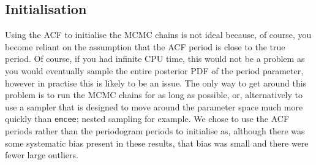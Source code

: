 \subsection{Initialisation}
Using the ACF to initialise the MCMC chains is not ideal because, of course,
you become reliant on the assumption that the ACF period is close to the true
period.
Of course, if you had infinite CPU time, this would not be a problem as you
would eventually sample the entire posterior PDF of the period parameter,
however in practise this is likely to be an issue.
The only way to get around this problem is to run the MCMC chains for as long
as possible, or, alternatively to use a sampler that is designed to move
around the parameter space much more quickly than {\tt emcee}; nested sampling
for example.
We chose to use the ACF periods rather than the periodogram periods to
initialise as, although there was some systematic bias present in these
results, that bias was small and there were fewer large outliers.

